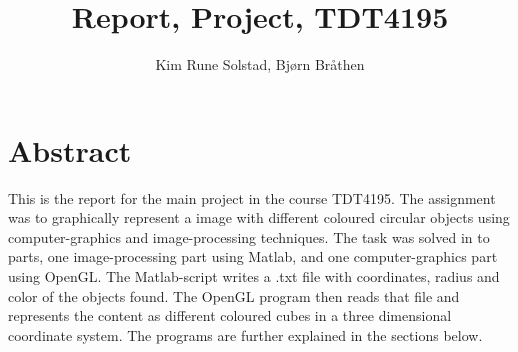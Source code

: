 \documentclass[english, a4paper]{article}
\title{Report, Project, TDT4195}
\author{Kim Rune Solstad, Bjørn Bråthen}
\begin{document}
\maketitle

\section{Abstract}
This is the report for the main project in the course TDT4195. The assignment was to graphically represent a image with different coloured circular objects using computer-graphics and image-processing techniques. The task was solved in to parts, one image-processing part using Matlab, and one computer-graphics part using OpenGL. The Matlab-script writes a .txt file with coordinates, radius and color of the objects found. The OpenGL program then reads that file and represents the content as different coloured cubes in a three dimensional coordinate system. The programs are further explained in the sections below. 




\end{document}

